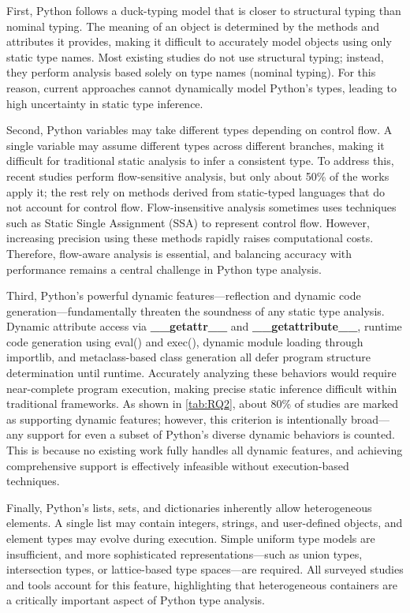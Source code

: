 First, Python follows a duck-typing model that is closer to structural typing
than nominal typing.
The meaning of an object is determined by the methods and attributes it
provides, making it difficult to accurately model objects using only static
type names.
Most existing studies do not use structural typing; instead, they perform
analysis based solely on type names (nominal typing).
For this reason, current approaches cannot dynamically model Python’s types,
leading to high uncertainty in static type inference.

Second, Python variables may take different types depending on control flow. 
A single variable may assume different types across different branches, making
it difficult for traditional static analysis to infer a consistent type.
To address this, recent studies perform flow-sensitive analysis, but only about
50\% of the works apply it; the rest rely on methods derived from static-typed
languages that do not account for control flow.
Flow-insensitive analysis sometimes uses techniques such as Static Single
Assignment (SSA) to represent control flow.
However, increasing precision using these methods rapidly raises computational
costs.
Therefore, flow-aware analysis is essential, and balancing accuracy with
performance remains a central challenge in Python type analysis.

Third, Python’s powerful dynamic features—reflection and dynamic code
generation—fundamentally threaten the soundness of any static type analysis.
Dynamic attribute access via \textbf{\_\_getattr\_\_} and
\textbf{\_\_getattribute\_\_}, runtime code generation using eval() and exec(),
dynamic module loading through importlib, and metaclass-based class generation
all defer program structure determination until runtime.
Accurately analyzing these behaviors would require near-complete program
execution, making precise static inference difficult within traditional
frameworks.
As shown in \autoref{tab:RQ2}, about 80\% of studies are marked as supporting
dynamic features; however, this criterion is intentionally broad—any support
for even a subset of Python’s diverse dynamic behaviors is counted.
This is because no existing work fully handles all dynamic features, and
achieving comprehensive support is effectively infeasible without
execution-based techniques.

Finally, Python’s lists, sets, and dictionaries inherently allow heterogeneous
elements. A single list may contain integers, strings, and user-defined
objects, and element types may evolve during execution. Simple uniform type
models are insufficient, and more sophisticated representations—such as union
types, intersection types, or lattice-based type spaces—are required. All
surveyed studies and tools account for this feature, highlighting that
heterogeneous containers are a critically important aspect of Python type
analysis.

